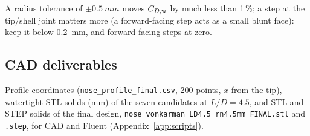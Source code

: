 A radius tolerance of $\pm\SI{0.5}{mm}$ moves $C_{D,\rm w}$ by much less than 1\,\%; a step at the
tip/shell joint matters more (a forward-facing step acts as a small blunt face): keep it below
\SI{0.2}{mm}, and forward-facing steps at zero.

\subsection{CAD deliverables}

{\sloppy Profile coordinates (\texttt{nose\_profile\_final.csv}, 200 points, $x$ from the tip),
watertight STL solids (mm) of the seven candidates at $L/D = 4.5$, and STL and STEP solids of the final
design, \texttt{nose\_vonkarman\_LD4.5\_rn4.5mm\_FINAL.stl} and \texttt{.step}, for CAD and Fluent
(Appendix~\ref{app:scripts}).\par}
